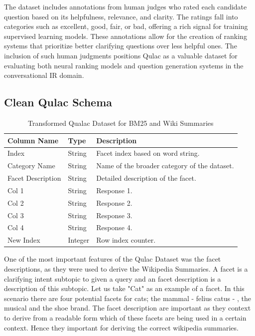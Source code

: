 \documentclass[11pt]{article}
\begin{document}
The dataset includes annotations from human judges who rated each candidate question based on its helpfulness, relevance, and clarity. The ratings fall into categories such as excellent, good, fair, or bad, offering a rich signal for training supervised learning models. These annotations allow for the creation of ranking systems that prioritize better clarifying questions over less helpful ones. The inclusion of such human judgments positions Qulac as a valuable dataset for evaluating both neural ranking models and question generation systems in the conversational IR domain.

\subsection{Clean Qulac Schema}
\renewcommand{\arraystretch}{1.2} %

\begin{table}[ht]
  \centering
  \caption{Transformed Qualac Dataset for BM25 and Wiki Summaries}
  \label{tab:dataset-columns}
  \begin{tabularx}{\columnwidth}{@{} l l X @{}}
    \hline
    \textbf{Column Name}  & \textbf{Type}    & \textbf{Description}                        \\ 
    \hline
    Index                 & String           & Facet index based on word string.            \\ 
    Category Name         & String           & Name of the broader category of the dataset. \\ 
    Facet Description     & String           & Detailed description of the facet.           \\ 
    Col 1                 & String           & Response 1.                                  \\ 
    Col 2                 & String           & Response 2.                                  \\ 
    Col 3                 & String           & Response 3.                                  \\ 
    Col 4                 & String           & Response 4.                                  \\ 
    New Index             & Integer          & Row index counter.                           \\ 
    \hline
  \end{tabularx}
\end{table}

One of the most important features of the Qulac Dataset was the facet descriptions, as they were used to derive the Wikipedia Summaries. A facet is a clarifying intent subtopic to given a query and an facet description is a description of this subtopic. Let us take "Cat" as an example of a facet. In this scenario there are four potential facets for cats; the mammal - felius catus - , the musical  and the shoe brand. The facet description are important as they context to derive from a readable form which of these facets are being used in a certain context. Hence they important for deriving the correct wikipedia summaries. 
\end{document}
